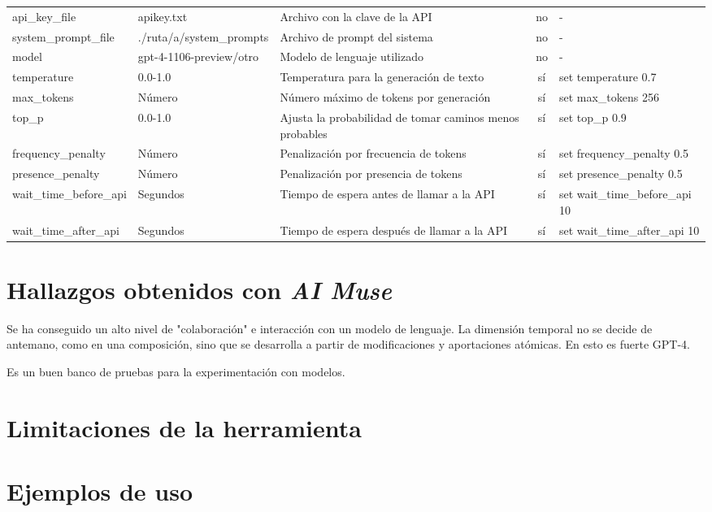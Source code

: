 \begin{landscape}
\begin{table}[htbp]
\begin{tabularx}{\linewidth}{lXlcl}
        api\_key\_file & \textcolor{pathcolor}{apikey.txt} & Archivo con la clave de la API & no & - \\
        system\_prompt\_file & \textcolor{pathcolor}{./ruta/a/system\_prompts} & Archivo de prompt del sistema & no & - \\
        model & gpt-4-1106-preview/otro & Modelo de lenguaje utilizado & no & - \\
        temperature & \textcolor{numbercolor}{0.0-1.0} & Temperatura para la generación de texto & sí & set temperature \textcolor{numbercolor}{0.7} \\
        max\_tokens & \textcolor{numbercolor}{Número} & Número máximo de tokens por generación & sí & set max\_tokens \textcolor{numbercolor}{256} \\
        top\_p & \textcolor{numbercolor}{0.0-1.0} & Ajusta la probabilidad de tomar caminos menos probables & sí & set top\_p \textcolor{numbercolor}{0.9} \\
        frequency\_penalty & \textcolor{numbercolor}{Número} & Penalización por frecuencia de tokens & sí & set frequency\_penalty \textcolor{numbercolor}{0.5} \\
        presence\_penalty & \textcolor{numbercolor}{Número} & Penalización por presencia de tokens & sí & set presence\_penalty \textcolor{numbercolor}{0.5} \\
        wait\_time\_before\_api & \textcolor{numbercolor}{Segundos} & Tiempo de espera antes de llamar a la API & sí & set wait\_time\_before\_api \textcolor{numbercolor}{10} \\
        wait\_time\_after\_api & \textcolor{numbercolor}{Segundos} & Tiempo de espera después de llamar a la API & sí & set wait\_time\_after\_api \textcolor{numbercolor}{10} \\
        \bottomrule
    \end{tabularx}
    \end{table}
    \end{landscape}
    





\section{Hallazgos obtenidos con \emph{AI Muse}}

Se ha conseguido un alto nivel de "colaboración" e interacción con un modelo de lenguaje. La dimensión temporal no se decide de antemano, como en una composición, sino que se desarrolla a partir de modificaciones y aportaciones atómicas. En esto es fuerte GPT-4.

Es un buen banco de pruebas para la experimentación con modelos. 

\section{Limitaciones de la herramienta}

\section{Ejemplos de uso}